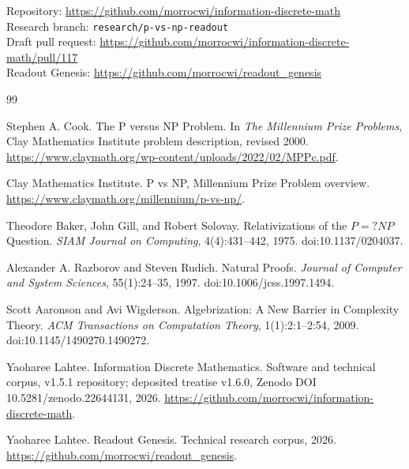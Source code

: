 \documentclass[11pt]{article}
\begin{document}
Repository: \url{https://github.com/morrocwi/information-discrete-math}\\
Research branch: \texttt{research/p-vs-np-readout}\\
Draft pull request: \url{https://github.com/morrocwi/information-discrete-math/pull/117}\\
Readout Genesis: \url{https://github.com/morrocwi/readout_genesis}

\begin{thebibliography}{99}

Stephen A. Cook.
\newblock The P versus NP Problem.
\newblock In \emph{The Millennium Prize Problems}, Clay Mathematics Institute problem description, revised 2000.
\newblock \url{https://www.claymath.org/wp-content/uploads/2022/02/MPPc.pdf}.

Clay Mathematics Institute.
\newblock P vs NP, Millennium Prize Problem overview.
\newblock \url{https://www.claymath.org/millennium/p-vs-np/}.

Theodore Baker, John Gill, and Robert Solovay.
\newblock Relativizations of the $P=?NP$ Question.
\newblock \emph{SIAM Journal on Computing}, 4(4):431--442, 1975.
\newblock doi:10.1137/0204037.

Alexander A. Razborov and Steven Rudich.
\newblock Natural Proofs.
\newblock \emph{Journal of Computer and System Sciences}, 55(1):24--35, 1997.
\newblock doi:10.1006/jcss.1997.1494.

Scott Aaronson and Avi Wigderson.
\newblock Algebrization: A New Barrier in Complexity Theory.
\newblock \emph{ACM Transactions on Computation Theory}, 1(1):2:1--2:54, 2009.
\newblock doi:10.1145/1490270.1490272.

Yaoharee Lahtee.
\newblock Information Discrete Mathematics.
\newblock Software and technical corpus, v1.5.1 repository; deposited treatise v1.6.0, Zenodo DOI 10.5281/zenodo.22644131, 2026.
\newblock \url{https://github.com/morrocwi/information-discrete-math}.

Yaoharee Lahtee.
\newblock Readout Genesis.
\newblock Technical research corpus, 2026.
\newblock \url{https://github.com/morrocwi/readout_genesis}.

\end{thebibliography}
\end{document}
